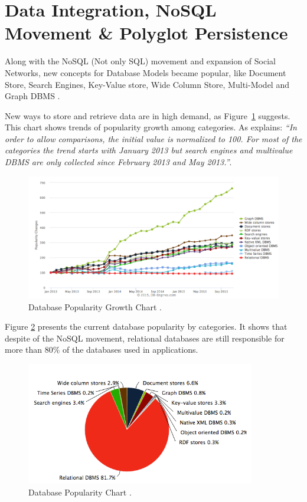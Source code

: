 \section{Data Integration, NoSQL Movement \& Polyglot Persistence}

Along with the NoSQL (Not only SQL) movement and expansion of Social Networks, new concepts for Database Models became popular, like Document Store, Search Engines, Key-Value store, Wide Column Store, Multi-Model and Graph DBMS \cite{dbrankingchart}. 

New ways to store and retrieve data are in high demand, as Figure~\ref{fig:popularityDB} suggests. This chart shows trends of popularity growth among categories. As \cite{dbrankingchart} explains: \textit{``In order to allow comparisons, the initial value is normalized to 100. For most of the categories the trend starts with January 2013 but search engines and multivalue DBMS are only collected since February 2013 and May 2013.''}. 



\begin{figure}[ht!]
\centering
\includegraphics[width=150mm]{popularityDB.png}
\caption{Database Popularity Growth Chart \cite{dbrankingchart}.\label{fig:popularityDB}}
\end{figure}

Figure \ref{fig:currentPopularity} presents the current database popularity by categories. It shows that despite of the NoSQL movement, relational databases are still responsible for more than 80\% of the databases used in applications.

\begin{figure}[ht!]
\centering
\includegraphics[width=100mm]{Imagens/DBpie.png}
\caption{Database Popularity Chart \cite{dbrankingchart}.\label{fig:currentPopularity}}
\end{figure}


